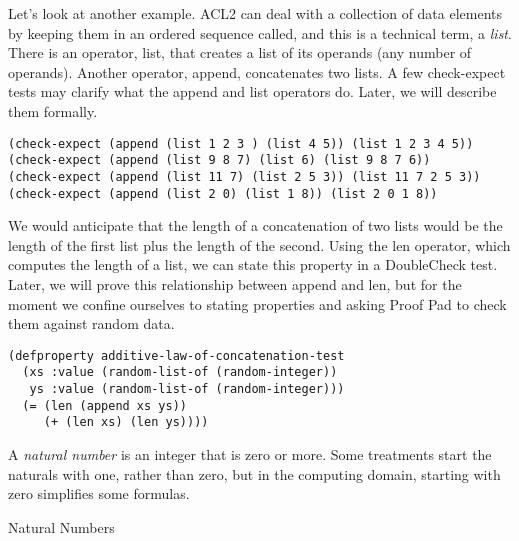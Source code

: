 Let's look at another example.
ACL2 can deal with a collection of data elements
by keeping them in an ordered sequence
called, and this is a technical term, a
\emph{list}.
There is an operator,
\label{list-op-informal}\textsf{list},
that creates a list of its operands
(any number of operands).
Another operator,
\label{append-op-informal}\textsf{append},
concatenates two lists.
A few \textsf{check-expect} tests may clarify
what the \textsf{append} and \textsf{list} operators do.
Later, we will describe them formally.

\begin{Verbatim}
(check-expect (append (list 1 2 3 ) (list 4 5)) (list 1 2 3 4 5))
(check-expect (append (list 9 8 7) (list 6) (list 9 8 7 6))
(check-expect (append (list 11 7) (list 2 5 3)) (list 11 7 2 5 3))
(check-expect (append (list 2 0) (list 1 8)) (list 2 0 1 8))
\end{Verbatim}

We would anticipate that the length of a concatenation of two lists
would be the length of the first list plus the length of the second.
Using the
\label{len-op-informal}\textsf{len}
operator, which computes the length of a list,
we can state this property in a DoubleCheck test.
Later, we will prove this relationship between \textsf{append} and \textsf{len},
but for the moment we confine ourselves to stating properties
and asking Proof Pad to check them against random data.

\label{additive-lengths-test}\begin{Verbatim}
(defproperty additive-law-of-concatenation-test
  (xs :value (random-list-of (random-integer))
   ys :value (random-list-of (random-integer)))
  (= (len (append xs ys))
     (+ (len xs) (len ys))))
\end{Verbatim}

\begin{aside}
A \emph{natural number} is
an integer that is zero or more.
Some treatments start the naturals with one,
rather than zero, but in the computing domain,
starting with zero simplifies some formulas.
\caption{Natural Numbers}
\label{natural-number-def}
\end{aside}


